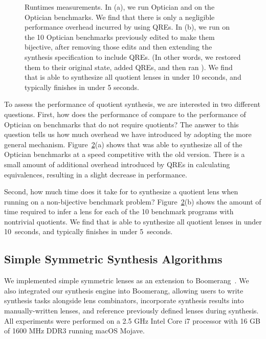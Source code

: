 \documentclass[12pt]{article}
\begin{document}
{\begin{figure}[t]
\begin{subfigure}[b]{.49\textwidth}
\caption{}
\label{subfig:examplesused}
\end{subfigure}
\caption{Runtimes measurements. In (a), we run Optician and \QOpt{}
  on the Optician benchmarks.  We find that there is only a negligible
  performance overhead incurred by using QREs. 
  In (b), we run \QOpt{} on the 10 Optician benchmarks
  previously edited to make them bijective, after removing those edits
  and then extending the synthesis specification to include QREs.
  (In other words, we restored them to their original state, added QREs,
  and then ran \QOpt{}). 
  We find that \QOpt{} is able to
  synthesize all quotient lenses in under 10 seconds, and typically finishes in
  under 5 seconds.}
\label{fig:times}
\end{figure}

To assess the performance of quotient synthesis, we are interested in two different
questions. First, how does the performance of \QOpt{} compare to the performance
of Optician on benchmarks that do not require quotients? The answer to this question
tells us how much overhead we have introduced by adopting the more general
mechanism. Figure~\ref{fig:times}(a) shows that \QOpt{} was able to synthesize
all of the Optician benchmarks at a speed competitive with the old version.
There is a small amount of additional overhead introduced by QREs in calculating
equivalences, resulting in a slight decrease in performance.

Second, how much time does it take for \QOpt{} to synthesize a quotient
lens when running on a non-bijective benchmark problem?  
Figure~\ref{fig:times}(b) shows the amount of time required to infer a
lens for each of the 10 benchmark programs with nontrivial quotients.  
We find that \QOpt{} is able to synthesize all quotient lenses in
under 10~seconds, and typically finishes in under 5~seconds.

\subsection{Simple Symmetric Synthesis Algorithms}
We implemented simple symmetric lenses as an extension to
Boomerang~\cite{boomerang}.  
We also integrated our synthesis engine into Boomerang, allowing users
to write synthesis tasks 
alongside lens combinators, incorporate synthesis results into manually-written
lenses, and reference previously defined lenses during synthesis. All experiments
were performed on a 2.5 GHz Intel Core i7 processor with 16 GB of 1600 MHz DDR3
running macOS Mojave.

}
\end{document}
